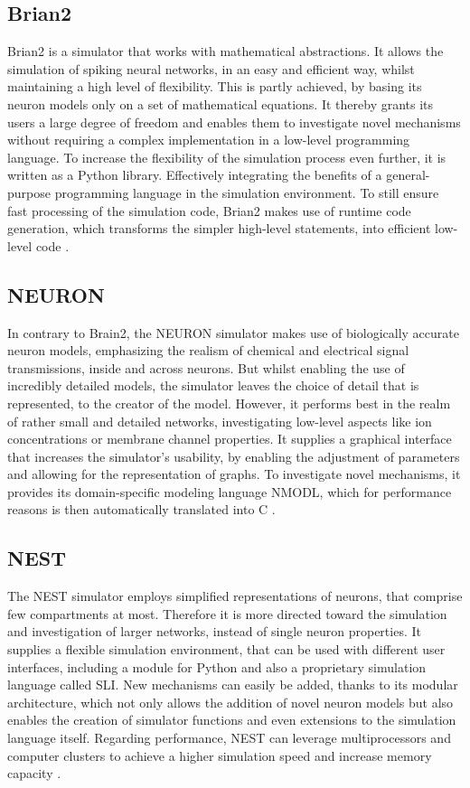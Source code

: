     \subsection{Brian2}
    Brian2 is a simulator that works with mathematical abstractions. It allows the simulation of spiking neural networks, in an easy and efficient way, whilst maintaining a high level of flexibility. This is partly achieved, by basing its neuron models only on a set of mathematical equations. It thereby grants its users a large degree of freedom and enables them to investigate novel mechanisms without requiring a complex implementation in a low-level programming language. To increase the flexibility of the simulation process even further, it is written as a Python \cite{van1995python} library. Effectively integrating the benefits of a general-purpose programming language in the simulation environment. To still ensure fast processing of the simulation code, Brian2 makes use of runtime code generation, which transforms the simpler high-level statements, into efficient low-level code \cite{Stimberg.20.8.2019}.
    
    
    \subsection{NEURON}
    In contrary to Brain2, the NEURON simulator makes use of biologically accurate neuron models, emphasizing the realism of chemical and electrical signal transmissions, inside and across neurons. But whilst enabling the use of incredibly detailed models, the simulator leaves the choice of detail that is represented, to the creator of the model. However, it performs best in the realm of rather small and detailed networks, investigating low-level aspects like ion concentrations or membrane channel properties. It supplies a graphical interface that increases the simulator's usability, by enabling the adjustment of parameters and allowing for the representation of graphs. To investigate novel mechanisms, it provides its domain-specific modeling language NMODL, which for performance reasons is then automatically translated into C \cite{Hines.1997}. 

    
    \subsection{NEST}
    The NEST simulator employs simplified representations of neurons, that comprise few compartments at most. Therefore it is more directed toward the simulation and investigation of larger networks, instead of single neuron properties. It supplies a flexible simulation environment, that can be used with different user interfaces, including a module for Python and also a proprietary simulation language called SLI. New mechanisms can easily be added, thanks to its modular architecture, which not only allows the addition of novel neuron models but also enables the creation of simulator functions and even extensions to the simulation language itself. Regarding performance, NEST can leverage multiprocessors and computer clusters to achieve a higher simulation speed and increase memory capacity \cite{Gewaltig:NEST}.
